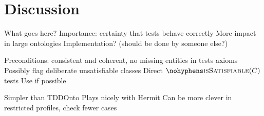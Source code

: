\documentclass[paper.tex]{subfiles}
\begin{document}
\section{Discussion}
\label{sec:discussion}

\begin{todos}
  \todo What goes here?
  \todo Importance: certainty that tests behave correctly
  \todo More impact in large ontologies
  \todo Implementation? (should be done by someone else?)
  \begin{todos}
    \todo Preconditions: consistent and coherent, no missing entities in tests axioms
    \todo Possibly flag deliberate unsatisfiable classes
    \todo Direct $\textproc{isSatisfiable}(C)$ tests
    \todo Use  if possible
  \end{todos}
  \todo Simpler than TDDOnto
  \todo Plays nicely with Hermit
  \todo Can be more clever in restricted profiles, check fewer cases
\end{todos}
\end{document}
